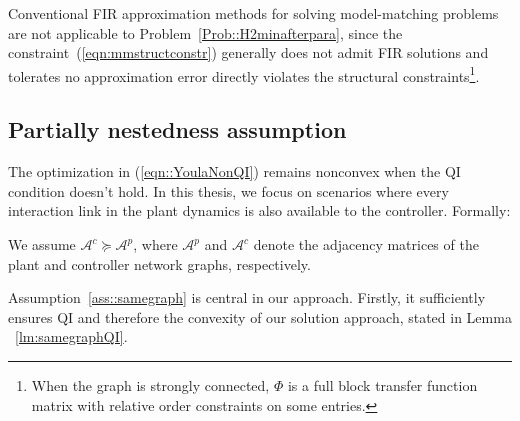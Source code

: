 Conventional FIR approximation methods for solving model-matching problems are not applicable to Problem~\ref{Prob::H2minafterpara}, since the constraint~(\ref{eqn:mmstructconstr}) generally does not admit FIR solutions and tolerates no approximation error directly violates the structural constraints\footnote{When the graph is strongly connected, \(\Phi\) is a full block transfer function matrix with relative order constraints on some entries.}.

\subsection{Partially nestedness assumption}
The optimization in (\ref{eqn::YoulaNonQI}) remains nonconvex when the QI condition doesn't hold. In this thesis, we focus on scenarios where every interaction link in the plant dynamics is also available to the controller. Formally:
\begin{assumption}\label{ass::samegraph}
We assume \(\mathcal{A}^c \succeq \mathcal{A}^p\), where \(\mathcal{A}^p\) and \(\mathcal{A}^c\) denote the adjacency matrices of the plant and controller network graphs, respectively.
\end{assumption}

Assumption~\ref{ass::samegraph} is central in our approach. Firstly, it sufficiently ensures QI and therefore the convexity of our solution approach, stated in Lemma ~\ref{lm:samegraphQI}. 

